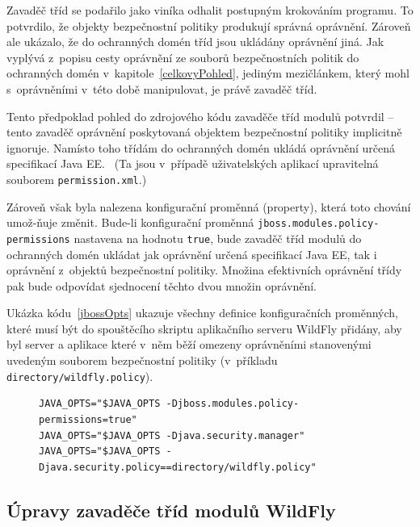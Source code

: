 Zavaděč tříd se podařilo jako viníka odhalit postupným krokováním programu.
To potvrdilo, že objekty bezpečnostní politiky produkují správná oprávnění.
Zároveň ale ukázalo, že do ochranných domén tříd jsou ukládány oprávnění jiná.
Jak vyplývá z~popisu cesty oprávnění ze souborů bezpečnostních politik do ochranných domén v~kapitole~\ref{celkovyPohled},
jediným mezičlánkem, který mohl s~oprávněními v~této době manipulovat, je právě zavaděč tříd.

Tento předpoklad pohled do zdrojového kódu zavaděče tříd modulů potvrdil -- tento zavaděč oprávnění poskytovaná objektem bezpečnostní politiky implicitně ignoruje.
Namísto toho třídám do ochranných domén ukládá oprávnění určená specifikací Java EE.~\cite{javaEEspec}
(Ta jsou v~případě uživatelských aplikací upravitelná souborem {\tt permission.xml}.)

Zároveň však byla nalezena konfigurační proměnná (property), která toto chování umož-{\linebreak}ňuje změnit.
Bude-li konfigurační proměnná {\tt jboss.modules.policy-permissions} nastavena na hodnotu {\tt true}, bude zavaděč tříd modulů do ochranných domén ukládat jak oprávnění určená specifikací Java EE, tak i oprávnění z~objektů bezpečnostní politiky.
Množina efektivních oprávnění třídy pak bude odpovídat sjednocení těchto dvou množin oprávnění.~\cite{sourceModuleClassLoader}

Ukázka kódu~\ref{jbossOpts} ukazuje všechny definice konfiguračních proměnných, které musí být do spouštěcího skriptu aplikačního serveru WildFly přidány,
aby byl server a aplikace které v~něm běží omezeny oprávněními stanovenými uvedeným souborem bezpečnostní politiky (v~příkladu {\tt directory/wildfly.policy}).

\begin{figure}[tbh]
\begin{lstlisting}[caption=Úprava spouštěcího skriptu pro spuštění s~bezpečnostní politikou, label=jbossOpts]
JAVA_OPTS="$JAVA_OPTS -Djboss.modules.policy-permissions=true"
JAVA_OPTS="$JAVA_OPTS -Djava.security.manager"
JAVA_OPTS="$JAVA_OPTS -Djava.security.policy==directory/wildfly.policy"
\end{lstlisting}
\end{figure}

\subsection{Úpravy zavaděče tříd modulů WildFly} \label{upravaZavadeceWildFly}

